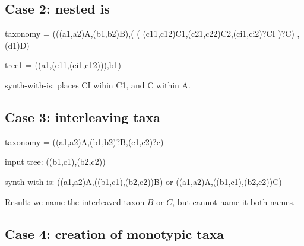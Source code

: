 \documentclass[english]{article}
\begin{document}
\subsection{Case 2: nested is}

taxonomy = (((a1,a2)A,(b1,b2)B),( (
(c11,c12)C1,(c21,c22)C2,(ci1,ci2)?CI )?C) ,(d1)D)

tree1 = ((a1,(c11,(ci1,c12))),b1)

synth-with-is: places CI wihin C1, and C within A.

\subsection{Case 3: interleaving taxa}

taxonomy = ((a1,a2)A,(b1,b2)?B,(c1,c2)?c)

input tree: ((b1,c1),(b2,c2))

synth-with-is: ((a1,a2)A,((b1,c1),(b2,c2))B) or
((a1,a2)A,((b1,c1),(b2,c2))C)

Result: we name the interleaved taxon $B$ or $C$, but cannot name it
both names.

\subsection{Case 4: creation of monotypic taxa}
\end{document}
